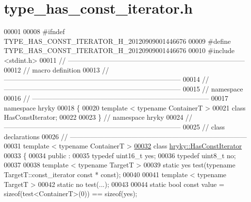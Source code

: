 \hypertarget{type__has__const__iterator_8h_source}{\section{type\-\_\-has\-\_\-const\-\_\-iterator.\-h}
}

\begin{DoxyCode}
00001 
00008 \textcolor{preprocessor}{#ifndef TYPE\_HAS\_CONST\_ITERATOR\_H\_20120909001446676}
00009 \textcolor{preprocessor}{}\textcolor{preprocessor}{#define TYPE\_HAS\_CONST\_ITERATOR\_H\_20120909001446676}
00010 \textcolor{preprocessor}{}\textcolor{preprocessor}{#include <stdint.h>}
00011 \textcolor{comment}{//
      ------------------------------------------------------------------------------}
00012 \textcolor{comment}{// macro definition}
00013 \textcolor{comment}{//
      ------------------------------------------------------------------------------}
00014 \textcolor{comment}{//
      ------------------------------------------------------------------------------}
00015 \textcolor{comment}{// namespace}
00016 \textcolor{comment}{//
      ------------------------------------------------------------------------------}
00017 \textcolor{keyword}{namespace }hryky
00018 \{
00020     \textcolor{keyword}{template} < \textcolor{keyword}{typename} ContainerT >
00021     \textcolor{keyword}{class }HasConstIterator;
00022 
00023 \} \textcolor{comment}{// namespace hryky}
00024 \textcolor{comment}{//
      ------------------------------------------------------------------------------}
00025 \textcolor{comment}{// class declarations}
00026 \textcolor{comment}{//
      ------------------------------------------------------------------------------}
00031 \textcolor{comment}{}\textcolor{keyword}{template} < \textcolor{keyword}{typename} ContainerT >
\hypertarget{type__has__const__iterator_8h_source_l00032}{}\hyperlink{classhryky_1_1_has_const_iterator}{00032} \textcolor{keyword}{class }\hyperlink{classhryky_1_1_has_const_iterator}{hryky::HasConstIterator}
00033 \{
00034 \textcolor{keyword}{public} :
00035     \textcolor{keyword}{typedef} uint16\_t    yes;
00036     \textcolor{keyword}{typedef} uint8\_t     no;
00037 
00038     \textcolor{keyword}{template} < \textcolor{keyword}{typename} TargetT >
00039     \textcolor{keyword}{static} yes test(\textcolor{keyword}{typename} TargetT::const\_iterator \textcolor{keyword}{const} * \textcolor{keyword}{const});
00040     
00041     \textcolor{keyword}{template} < \textcolor{keyword}{typename} TargetT >
00042     \textcolor{keyword}{static} no test(...);
00043 
00044     \textcolor{keyword}{static} \textcolor{keywordtype}{bool} \textcolor{keyword}{const} value = \textcolor{keyword}{sizeof}(test<ContainerT>(0)) == \textcolor{keyword}{sizeof}(yes);

\end{DoxyCode}
